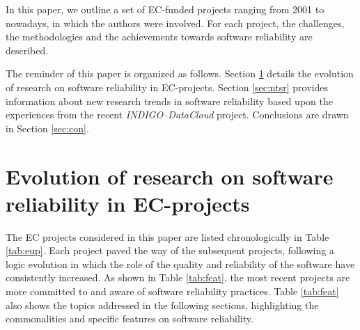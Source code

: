 \documentclass[journal]{IEEEtran}
\begin{document}
In this paper, we outline a set of EC-funded projects
ranging from 2001 to nowadays, in which the authors were involved.
For each project, the challenges, the methodologies and
the achievements towards software reliability are described.

The reminder of this paper is
organized as follows. Section \ref{sec:ev} details the evolution of research on
software reliability in EC-projects. Section \ref{sec:ntsr} provides
information about new research trends in software reliability based upon the
experiences from the recent {\sl INDIGO--DataCloud} project. Conclusions are drawn in Section \ref{sec:con}.

\section{Evolution of research on software reliability in EC-projects}
\label{sec:ev}

The EC projects considered in this paper are listed chronologically in Table
\ref{tab:eup}. Each project paved the way of the subsequent projects,
following a logic evolution in which the role of the quality and reliability of the software have
consistently increased. As shown in Table \ref{tab:feat}, the most recent projects are more committed to and aware of software reliability practices.
Table \ref{tab:feat} also shows the topics addressed in the following sections, highlighting
the commonalities and specific features on software reliability.
\end{document}
